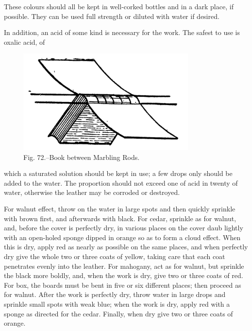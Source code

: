 \documentclass[twoside]{book}
\begin{document}
These colours should all be kept in well-corked
bottles and in a dark place, if possible. They can
be used full strength or diluted with water if
desired.

In addition, an acid of some kind is necessary for
the work. The safest to use is oxalic acid, of
	\begin{figure}[h]
		\centering
		\includegraphics[width=0.8\textwidth]{Figures/_072.png}
		\caption*{Fig. 72.--Book between Marbling Rods.}
	\end{figure}
which a saturated solution should be kept in use;
a few drops only should be added to the water.
The proportion should not exceed one of acid in
twenty of water, otherwise the leather may be
corroded or destroyed.

For walnut effect, throw on the water in large
spots and then quickly sprinkle with brown first,
and afterwards with black. For cedar, sprinkle
as for walnut, and, before the cover is perfectly
dry, in various places on the cover daub lightly
with an open-holed sponge dipped in orange so as
to form a cloud effect. When this is dry, apply
red as nearly as possible on the same places, and
when perfectly dry give the whole two or three
coats of yellow, taking care that each coat penetrates
\pagebreak
evenly into the leather. For mahogany, act
as for walnut, but sprinkle the black more boldly,
and, when the work is dry, give two or three coats
of red. For box, the boards must be bent in five
or six different places; then proceed as for walnut.
After the work is perfectly dry, throw water in
large drops and sprinkle small spots with weak
blue; when the work is dry, apply red with a
sponge as directed for the cedar. Finally, when
dry give two or three coats of orange.

\pagebreak


\thispagestyle{empty}
\end{document}
